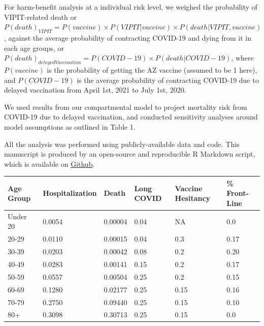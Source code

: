 \documentclass[]{interact}
\theoremstyle{plain}%
\theoremstyle{definition}
\theoremstyle{remark}
\begin{document}
For harm-benefit analysis at a individual risk level, we weighed the
probability of VIPIT-related death or
\(P(death)_{VIPIT} = P(vaccine) \times P(VIPIT|vaccine) \times P(death|VIPIT, vaccine)\),
against the average probability of contracting COVID-19 and dying from
it in each age groups, or
\(P(death)_{delayedVaccination} = P(COVID-19) \times P(death|COVID-19)\),
where \(P(vaccine)\) is the probability of getting the AZ vaccine
(assumed to be 1 here), and \(P(COVID-19)\) is the average probability
of contracting COVID-19 due to delayed vaccination from April 1st, 2021
to July 1st, 2020.

We used results from our compartmental model to project mortality risk
from COVID-19 due to delayed vaccination, and conducted sensitivity
analyses around model assumptions as outlined in Table 1.

All the analysis was performed using publicly-available data and code.
This manuscript is produced by an open-source and reproducible R
Markdown script, which is available on
\href{https://github.com/aminadibi/astrazenecaVIPIT}{Github}.

\begin{table}
{\begin{tabular}{llllll} \toprule
Age  Group & Hospitalization & Death   & Long COVID & Vaccine Hesitancy & \% Front-Line \\ \hline
Under 20   & 0.0054          & 0.00004 & 0.04       & NA                & 0.0           \\ 
20-29      & 0.0110          & 0.00015 & 0.04       & 0.3               & 0.17          \\ 
30-39      & 0.0203          & 0.00042 & 0.08       & 0.2               & 0.20          \\ 
40-49      & 0.0283          & 0.00141 & 0.15       & 0.2               & 0.17          \\ 
50-59      & 0.0557          & 0.00504 & 0.25       & 0.2               & 0.15          \\ 
60-69      & 0.1280          & 0.02177 & 0.25       & 0.15              & 0.16          \\ 
70-79      & 0.2750          & 0.09440 & 0.25       & 0.15              & 0.10          \\ 
80+        & 0.3098          & 0.30713 & 0.25       & 0.15              & 0.0           \\ \bottomrule
\end{tabular}}
\label{model-param}
\end{table}
\end{document}
